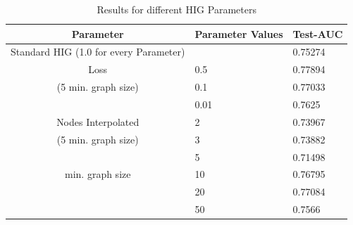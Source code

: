 \begin{table}[ht!]
    \centering
    \caption{Results for different HIG Parameters}
    \label{node_features}
    \begin{tabular}{c || l| p{6cm} |}
        Parameter            & Parameter Values & Test-AUC \\
        \hline
        \hline
        Standard HIG (1.0 for every Parameter)      &                        & 0.75274  \\
        \hline
        Loss               & 0.5                    & 0.77894  \\
        (5 min. graph size)                   & 0.1                    & 0.77033  \\
                           & 0.01                   & 0.7625   \\
        \hline
        Nodes Interpolated & 2                      & 0.73967  \\
    (5 min. graph size)             & 3                      & 0.73882  \\
                                   & 5                      & 0.71498  \\
        \hline
        min. graph size    & 10                & 0.76795  \\
                 & 20                & 0.77084  \\
                           & 50                & 0.7566   \\
    \end{tabular}
\end{table}

